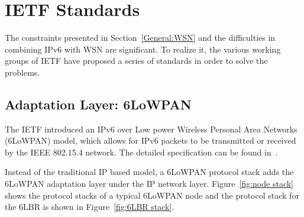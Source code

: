 \chapter{IETF Standards}
\label{IETF}
The constraints presented in Section~\ref{General:WSN} and the difficulties in combining IPv6 with WSN are significant. To realize it, the various working groups of IETF have proposed a series of standards in order to solve the problems.

\section{Adaptation Layer: 6LoWPAN}
\label{Intr:6LoWPAN}
The IETF introduced an IPv6 over Low power Wireless Personal Area Networks (6LoWPAN) model, which allows for IPv6 packets to be transmitted or received by the IEEE 802.15.4 network. The detailed specification can be found in~\cite{RFC 4944}.

Instead of the traditional IP based model, a 6LoWPAN protocol stack adds the 6LoWPAN adaptation layer under the IP network layer. Figure~\ref{fig:node stack} shows the protocol stacks of a typical 6LoWPAN node and the protocol stack for the 6LBR is shown in Figure~\ref{fig:6LBR stack}.

